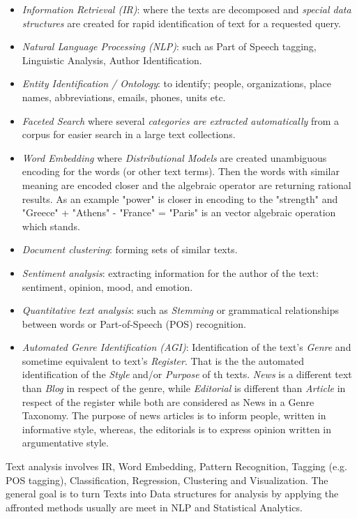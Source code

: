 \begin{itemize}
\item \textit{Information Retrieval (IR)}: where the texts are decomposed and \textit{special data structures} are created for rapid identification of text for a requested query.
\item \textit{Natural Language Processing (NLP)}: such as Part of Speech tagging, Linguistic Analysis, Author Identification.
\item \textit{Entity Identification / Ontology}: to identify; people, organizations, place names, abbreviations, emails, phones, units etc.
\item \textit{Faceted Search} where several \textit{categories are extracted automatically} from a corpus for easier search in a large text collections.
\item \textit{Word Embedding} where \textit{Distributional Models} are created unambiguous encoding for the words (or other text terms). Then the words with similar meaning are encoded closer and the algebraic operator are returning rational results. As an example "power" is closer in encoding to the "strength" and "Greece" + "Athens" - "France" = "Paris" is an vector algebraic operation which stands.
\item \textit{Document clustering}: forming sets of similar texts.
\item \textit{Sentiment analysis}: extracting information for the author of the text: sentiment, opinion, mood, and emotion. 
\item \textit{Quantitative text analysis}: such as \textit{Stemming} or grammatical relationships between words or Part-of-Speech (POS) recognition.
\item \textit{Automated Genre Identification (AGI)}: Identification of the text's \textit{Genre} and sometime equivalent to text's \textit{Register}. That is the the automated identification of the \textit{Style} and/or \textit{Purpose} of th texts. \textit{News} is a different text than \textit{Blog} in respect of the genre, while \textit{Editorial} is different than \textit{Article} in respect of the register while both are considered as News in a Genre Taxonomy. The purpose of news articles is to inform people, written in informative style, whereas, the editorials is to express opinion written in argumentative style.
\end{itemize}

Text analysis involves IR, Word Embedding, Pattern Recognition, Tagging (e.g. POS tagging), Classification, Regression, Clustering and Visualization. The general goal is to turn Texts into Data structures for analysis by applying the affronted methods usually are meet in NLP and Statistical Analytics.


